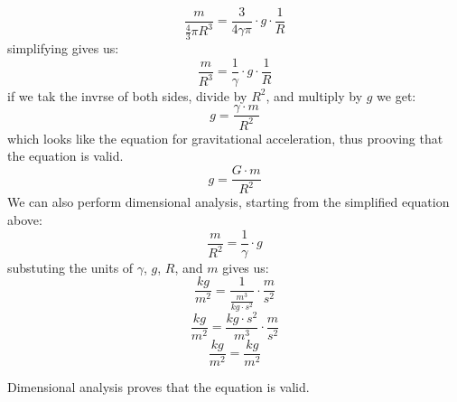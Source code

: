 \documentclass{article}
\theoremstyle{plain}
\begin{document}
\begin{enumerate}
{\begin{problem}
          \begin{equation}
              \frac{m}{\frac{4}{3}\pi R^3} = \frac{3}{4 \gamma \pi} \cdot g \cdot \frac{1}{R}
          \end{equation}
          simplifying gives us:
          \begin{equation}
              \frac{m}{R^3} = \frac{1}{\gamma} \cdot g \cdot \frac{1}{R}
          \end{equation}
          if we tak the invrse of both sides, divide by \(R^2\), and multiply by \(g\) we get:
          \begin{equation}
              g = \frac{\gamma \cdot m}{R^2}
          \end{equation}
          which looks like the equation for gravitational acceleration, thus prooving that the equation is valid.
          \begin{equation}
              g = \frac{G \cdot m}{R^2}
          \end{equation}
          We can also perform dimensional analysis, starting from the simplified equation above:
          \begin{equation}
              \frac{m}{R^2} = \frac{1}{\gamma} \cdot g
          \end{equation}
          substuting the units of \(\gamma\), \(g\), \(R\), and \(m\) gives us:
          \begin{equation}
              \frac{kg}{m^2} = \frac{1}{\frac{m^3}{kg \cdot s^2}} \cdot \frac{m}{s^2}
          \end{equation}
          \begin{equation}
              \frac{kg}{m^2} = \frac{kg \cdot s^2}{m^3} \cdot \frac{m}{s^2}
          \end{equation}
          \begin{equation}
              \frac{kg}{m^2} = \frac{kg}{m^2}
          \end{equation}

          Dimensional analysis proves that the equation is valid.


\end{problem}}
\end{enumerate}
\end{document}
